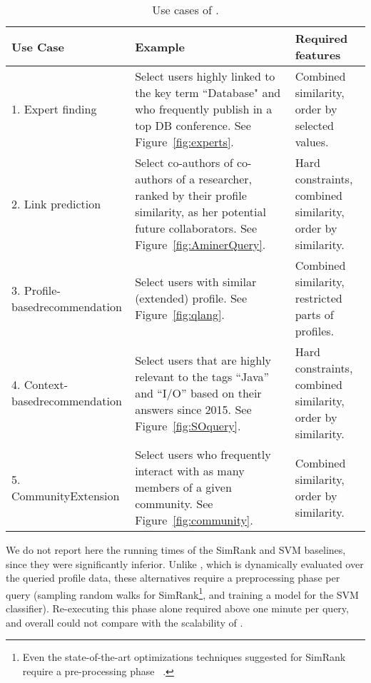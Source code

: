  \begin{table}
 	\hspace{-1mm}
 	{\scriptsize
 		\begin{tabularx}{1.0\columnwidth}{p{}p{}p{}}
 			\toprule
 			\textbf{Use Case} & \textbf{Example} & \textbf{Required \qlang{}\newline features} \\
 			\midrule
 			\textsf{1. Expert finding} & Select users highly linked to the key term ``Database" and who frequently publish in a top DB conference. See Figure~\ref{fig:experts}. & Combined similarity, order by selected values.\\
 			\midrule
 			\textsf{2. Link prediction} & Select co-authors of co-authors of a researcher, ranked by their profile similarity, as her potential future collaborators. See Figure~\ref{fig:AminerQuery}. & Hard constraints, combined similarity, order by similarity.\\
 			\midrule
 			\textsf{3. Profile-based\newline recommendation} & Select users with similar (extended) profile. See Figure~\ref{fig:qlang}. & Combined similarity,  restricted parts of profiles. \\
 			\midrule
 			\textsf{4. Context-based\newline recommendation} & Select users that are highly relevant to the tags ``Java'' and ``I/O'' based on their answers since 2015. See Figure~\ref{fig:SOquery}. & Hard constraints, combined similarity, order by similarity. \\
 			\midrule
 			\textsf{5. Community\newline Extension} & Select users who frequently interact with as many members of a given community. See Figure~\ref{fig:community}. & Combined similarity, order by similarity.\\
 			\bottomrule
 		\end{tabularx}
 	}
 	\caption{Use cases of \qlang{}.}
 	\label{fig:use cases}
 \end{table}

We do not report here the running times of the SimRank and SVM baselines, since they were significantly inferior. Unlike \qlang{}, which is dynamically evaluated over the queried profile data, these alternatives require a preprocessing phase per query (sampling random walks for SimRank\footnote{Even the state-of-the-art optimizations techniques suggested for SimRank require a pre-processing phase ~\cite{tian2016sling, jiang2017reads}.}, and training a model for the SVM classifier). Re-executing this phase alone required above one minute per query, and overall could not compare with the scalability of \qlang{}.

